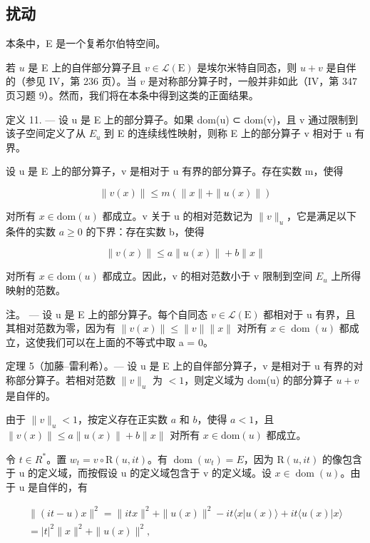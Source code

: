 \subsection{扰动}

本条中，E 是一个复希尔伯特空间。

若 \(u\) 是 E 上的自伴部分算子且 \(v \in \mathcal{L}(\mathrm{E})\) 是埃尔米特自同态，则 \(u + v\) 是自伴的（参见 IV，第 236 页）。当 \(v\) 是对称部分算子时，一般并非如此（IV，第 347 页习题 9）。然而，我们将在本条中得到这类的正面结果。

定义 11. --- 设 u 是 E 上的部分算子。如果 dom(u) ⊂ dom(v)，且 v 通过限制到该子空间定义了从 \(E_{u}\) 到 E 的连续线性映射，则称 E 上的部分算子 v 相对于 u 有界。

设 u 是 E 上的部分算子，v 是相对于 u 有界的部分算子。存在实数 m，使得

\[
\| v (x) \| \leqslant m (\| x \| + \| u (x) \|)
\]

对所有 \(x \in \text{dom}(u)\) 都成立。v 关于 u 的相对范数记为 \(\|v\|_{u}\)，它是满足以下条件的实数 \(a \geqslant 0\) 的下界：存在实数 b，使得

\[
\| v (x) \| \leqslant a \| u (x) \| + b \| x \|
\]

对所有 \(x \in \text{dom}(u)\) 都成立。因此，v 的相对范数小于 v 限制到空间 \(E_{u}\) 上所得映射的范数。

注。 --- 设 u 是 E 上的部分算子。每个自同态 \(v \in \mathcal{L}(\mathrm{E})\) 都相对于 u 有界，且其相对范数为零，因为有 \(\|v(x)\| \leqslant \|v\|\|x\|\) 对所有 \(x \in \operatorname{dom}(u)\) 都成立，这使我们可以在上面的不等式中取 a = 0。

定理 5（加藤–雷利希）。— 设 u 是 E 上的自伴部分算子，v 是相对于 u 有界的对称部分算子。若相对范数 \(\|v\|_{u}\) 为 \(< 1\)，则定义域为 dom(u) 的部分算子 \(u + v\) 是自伴的。

由于 \(\| v \|_u < 1\)，按定义存在正实数 \(a\) 和 \(b\)，使得 \(a < 1\)，且 \(\| v(x) \| \leqslant a \| u(x) \| + b \| x \|\) 对所有 \(x \in \text{dom}(u)\) 都成立。

令 \(t \in R^{*}\)。置 \(w_{t} = v \circ \mathrm{R}(u, it)\)。有 \(\operatorname{dom}(w_{t}) = E\)，因为 \(\mathrm{R}(u, it)\) 的像包含于 u 的定义域，而按假设 u 的定义域包含于 v 的定义域。设 \(x \in \operatorname{dom}(u)\)。由于 u 是自伴的，有

\[
\begin{array}{c} \| (i t - u) x \| ^ {2} = \| i t x \| ^ {2} + \| u (x) \| ^ {2} - i t \langle x | u (x) \rangle + i t \langle u (x) | x \rangle \\ = | t | ^ {2} \| x \| ^ {2} + \| u (x) \| ^ {2}, \end{array}
\]

